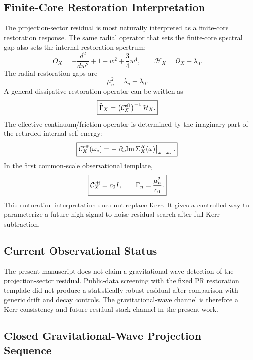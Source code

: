\documentclass[11pt]{article}
\begin{document}
\subsection{Finite-Core Restoration Interpretation}

The projection-sector residual is most naturally interpreted as a finite-core restoration response. The same radial operator that sets the finite-core spectral gap also sets the internal restoration spectrum:
\begin{equation}
\boxed{
O_X
=
-\frac{d^2}{dw^2}
+
1+w^2+\frac34w^4,
\qquad
\mathcal H_X
=
O_X-\lambda_0.
}
\end{equation}
The radial restoration gaps are
\begin{equation}
\boxed{
\mu_n^2
=
\lambda_n-\lambda_0.
}
\end{equation}
A general dissipative restoration operator can be written as
\begin{equation}
\boxed{
\widehat{\Gamma}_X
=
\left(
\mathcal C_X^{\rm eff}
\right)^{-1}
\mathcal H_X.
}
\end{equation}
The effective continuum/friction operator is determined by the imaginary part of the retarded internal self-energy:
\begin{equation}
\boxed{
\mathcal C_X^{\rm eff}(\omega_\ast)
=
-
\left.
\partial_\omega
{\rm Im}\,\Sigma_X^R(\omega)
\right|_{\omega=\omega_\ast}.
}
\end{equation}
In the first common-scale observational template,
\begin{equation}
\boxed{
\mathcal C_X^{\rm eff}=c_0I,
\qquad
\Gamma_n
=
\frac{\mu_n^2}{c_0}.
}
\end{equation}
This restoration interpretation does not replace Kerr. It gives a controlled way to parameterize a future high-signal-to-noise residual search after full Kerr subtraction.

\subsection{Current Observational Status}

The present manuscript does not claim a gravitational-wave detection of the projection-sector residual. Public-data screening with the fixed PR restoration template did not produce a statistically robust residual after comparison with generic drift and decay controls. The gravitational-wave channel is therefore a Kerr-consistency and future residual-stack channel in the present work.

\subsection{Closed Gravitational-Wave Projection Sequence}
\end{document}
